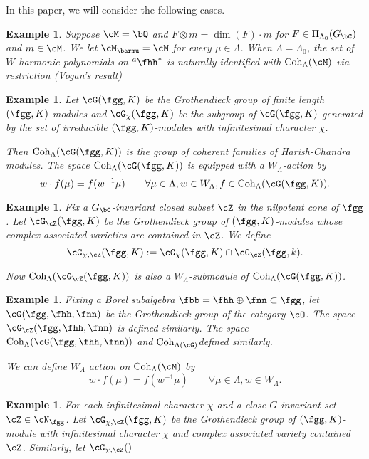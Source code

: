 \documentclass[12pt,a4paper]{amsart}
\numberwithin{equation}{section}
\newtheorem{eg}[thm]{Example}
\theoremstyle{remark}
\def\Gc{G_\bC}
\def\hha{{}^a\fhh}
\def\PiGlfin{\Pi_{\Lambda_0}( \Gc )}
\def\Wlam{W_{[\lambda]}}
\def\WLam{W_{\Lambda}}
\def\Coh{\mathrm{Coh}}
\def\Cohlm{\Coh_{\Lambda}(\cM)}
\begin{document}
In this paper, we will consider the following cases.

\begin{eg}
Suppose $\cM = \bQ$ and $F\otimes m = \dim(F)\cdot m$ for $F\in \PiGlfin$ and $m\in \cM$.
We let $\cM_{\barmu} = \cM$ for every $\mu\in \Lambda$.
When $\Lambda = \Lambda_0$, the set of $W$-harmonic polynomials on $\hha^*$ is naturally
identified with $\Cohlm$ via restriction (Vogan's result)

\end{eg}

\begin{eg}
Let $\Grt(\fgg,K)$ be the Grothendieck group of finite length $(\fgg,K)$-modules
and $\Grt_{\chi}(\fgg,K)$ be the subgroup of $\Grt(\fgg,K)$ generated by the
set of irreducible $(\fgg,K)$-modules with infinitesimal character $\chi$.

Then $\Coh_\Lambda(\cG(\fgg,K))$ is the group of coherent families of Harish-Chandra modules.
The space $\Coh_\Lambda(\cG(\fgg,K))$ is equipped with a $\WLam$-action by
  \[
    w\cdot f(\mu) =  f(w^{-1} \mu) \qquad \forall \mu\in \Lambda, w\in \WLam,
    f \in \Coh_{\Lambda}(\Grt(\fgg,K)).
  \]
\end{eg}

\begin{eg}
  Fix a $\Gc$-invariant closed subset $\cZ$ in the nilpotent cone of $\fgg$. Let
  $\Grt_{\cZ}(\fgg,K)$ be the Grothendieck group of $(\fgg,K)$-modules
  whose complex associated varieties are contained in $\cZ$.
  We define
  \[
    \Grt_{\chi,\cZ}(\fgg,K) := \Grt_{\chi}(\fgg,K)\cap \Grt_{\cZ}(\fgg,k).
  \]

  Now $\Coh_{\Lambda}(\Grt_{\cZ}(\fgg,K))$ is also a $\WLam$-submodule of
  $\Coh_\Lambda(\cG(\fgg,K))$.
\end{eg}

\begin{eg}
  Fixing a Borel subalgebra $\fbb = \fhh\oplus \fnn \subset \fgg$, let
  $\cG(\fgg,\fhh,\fnn)$ be the Grothendieck group of the category $\cO$.
  The space $\cG_{\cZ}(\fgg,\fhh,\fnn)$ is defined similarly.
  The
  space $\Coh_\Lambda(\cG(\fgg,\fhh,\fnn))$ and $\Coh_{\Lambda(\cG)}$defined
  similarly.

We can define $W_{\Lambda}$ action on $\Coh_\Lambda(\cM)$ by
\[
   w\cdot f(\mu) =  f(w^{-1} \mu) \qquad \forall \mu\in \Lambda, w\in \WLam.
\]
\end{eg}

\begin{eg}
For each infinitesimal character $\chi$ and
a close $G$-invariant set $\cZ\in \cN_{\fgg}$.
Let $\Grt_{\chi,\cZ}(\fgg,K)$ be the Grothendieck group of $(\fgg,K)$-module
with infinitesimal character $\chi$ and complex associated variety contained
$\cZ$.
Similarly, let $\Grt_{\chi,\cZ}()$
\end{eg}
\end{document}
